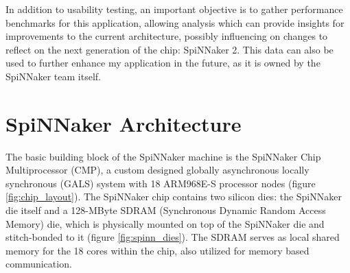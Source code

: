 In addition to usability testing, an important objective is to gather performance benchmarks for this application, allowing analysis which can provide insights for improvements to the current architecture, possibly influencing on changes to reflect on the next generation of the chip: SpiNNaker 2. This data can also be used to further enhance my application in the future, as it is owned by the SpiNNaker team itself.

\section{SpiNNaker Architecture}

The basic building block of the SpiNNaker machine is the SpiNNaker Chip Multiprocessor (CMP), a custom designed globally asynchronous locally synchronous (GALS) system with 18 ARM968E-S processor nodes (figure \ref{fig:chip_layout}). \cite{painkras}
The SpiNNaker chip contains two silicon dies: the SpiNNaker die itself and a 128-MByte SDRAM (Synchronous Dynamic Random Access Memory) die, which is physically mounted on top of the SpiNNaker die and stitch-bonded to it (figure \ref{fig:spinn_dies}). \cite{spinnchip} The SDRAM serves as local shared memory for the 18 cores within the chip, also utilized for memory based communication. \cite{datasheet}

